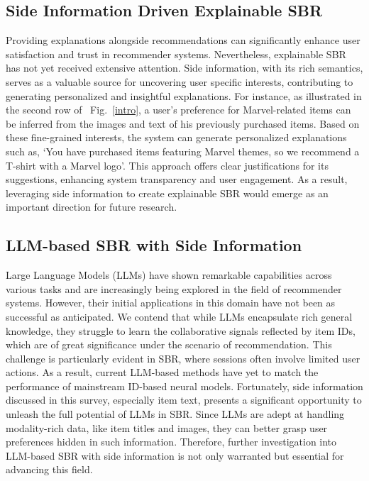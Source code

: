 \documentclass[lettersize,journal]{IEEEtran}
\newcommand{\fig}{Fig.\xspace}
\begin{document}
\subsection{Side Information Driven Explainable SBR}
Providing explanations alongside recommendations can significantly enhance user satisfaction and trust in recommender systems. Nevertheless, explainable SBR has not yet received extensive attention. Side information, with its rich semantics, serves as a valuable source for uncovering user specific interests, contributing to generating personalized and insightful explanations. For instance, as illustrated in the second row of ~\fig~\ref{intro}, a user's preference for Marvel-related items can be inferred from the images and text of his previously purchased items. Based on these fine-grained interests, the system can generate personalized explanations such as, `You have purchased items featuring Marvel themes, so we recommend a T-shirt with a Marvel logo'. This approach offers clear justifications for its suggestions, enhancing system transparency and user engagement. As a result, leveraging side information to create explainable SBR would emerge as an important direction for future research.



\subsection{LLM-based SBR with Side Information}
Large Language Models (LLMs) have shown remarkable capabilities across various tasks and are increasingly being explored in the field of recommender systems. However, their initial applications in this domain have not been as successful as anticipated. We contend that while LLMs encapsulate rich general knowledge, they struggle to learn the collaborative signals reflected by item IDs, which are of great significance under the scenario of recommendation. This challenge is particularly evident in SBR, where sessions often involve limited user actions. As a result, current LLM-based methods have yet to match the performance of mainstream ID-based neural models. Fortunately, side information discussed in this survey, especially item text, presents a significant opportunity to unleash the full potential of LLMs in SBR. Since LLMs are adept at handling modality-rich data, like item titles and images, they can better grasp user preferences hidden in such information. Therefore, further investigation into LLM-based SBR with side information is not only warranted but essential for advancing this field.
\end{document}
